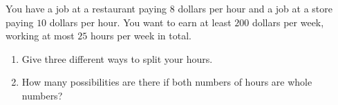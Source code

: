 You have a job at a restaurant paying $8$ dollars per hour and a job at a store paying $10$ dollars per hour. You want to earn at least $200$ dollars per week, working at most $25$ hours per week in total.
\begin{enumerate}
\item[(a)] Give three different ways to split your hours.
\item[(b)] How many possibilities are there if both numbers of hours are whole numbers?
\end{enumerate}

